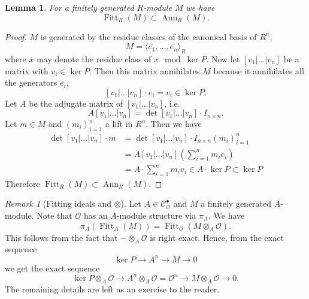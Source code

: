 \documentclass{article}
\theoremstyle{plain}%
\newtheorem{lemma}[theorem]{Lemma}
\theoremstyle{definition}
\theoremstyle{remark}
\newtheorem{remark}[theorem]{Remark}
\newcommand{\cob}{\mathcal{C}_\mathcal{O}^\bullet}
\newcommand{\ann}{\operatorname{Ann}}
\newcommand{\fitt}{\operatorname{Fitt}}
\begin{document}
\begin{lemma}\label{lem:fitting_and_ann}
    For a finitely generated \(R\)-module \(M\) we have
    \[\fitt_R(M) \subset \ann_R(M).\]
\end{lemma}
\begin{proof}
    \(M\) is generated by the residue classes of the canonical basis of \(R^n\),
    \[
        M = \langle \overline{e_1}, \dots, \overline{e_n}\rangle_R    
    \]
    where \(\overline{x}\) may denote the residue class of \(x \mod \ker P\).
    Now let \([v_1|\dots|v_n]\) be a matrix with \(v_i \in \ker P\). Then this matrix annihilates \(M\) because
    it annihilates all the generators \(\overline{e_i}\),
    \[
        [v_1|\dots|v_n] \cdot e_i = v_i \in \ker P.
    \]
    Let \(A\) be the adjugate matrix of \([v_1|\dots|v_n]\), i.e. \[A[v_1|\dots|v_n] = \det [v_1|\dots|v_n]\cdot I_{n\times n}.\]
    Let \(m \in M\) and \((m_i)_{i=1}^n\) a lift in \(R^n\). Then we have 
    \begin{align*}
        \det [v_1|\dots|v_n] \cdot m &= \det [v_1|\dots|v_n]\cdot I_{n\times n} (m_i)_{i=1}^n \\
        &= A[v_1|\dots|v_n]\left(\sum_{i=1}^n m_i e_i\right)\\
        &= A \cdot \sum_{i=1}^n m_i v_i \in A \cdot \ker P \subset \ker P
    \end{align*}
    Therefore \(\fitt_R(M) \subset \ann_R(M)\).
\end{proof}

\begin{remark}[Fitting ideals and \(\otimes\)]\label{rem:fitting_and_tensor}
    Let \(A \in \cob\) and \(M\) a finitely generated \(A\)-module. 
    Note that \(\mathcal{O}\) has an \(A\)-module structure via \(\pi_A\).
    We have
    \[
        \pi_A(\fitt_A(M)) = \fitt_\mathcal{O}(M \otimes_A \mathcal{O}).
    \]
    This follows from the fact that \(- \otimes_A \mathcal{O}\) is right exact. 
    Hence, from the exact sequence
    \[
        \ker P \longrightarrow A^n \longrightarrow M \longrightarrow 0
    \]
    we get the exact sequence
    \[
        \ker P \otimes_A \mathcal{O} \longrightarrow A^n\otimes_A \mathcal{O} = \mathcal{O}^n 
        \longrightarrow M\otimes_A \mathcal{O} \longrightarrow 0.
    \]
    The remaining details are left as an exercise to the reader.
\end{remark}
\end{document}
